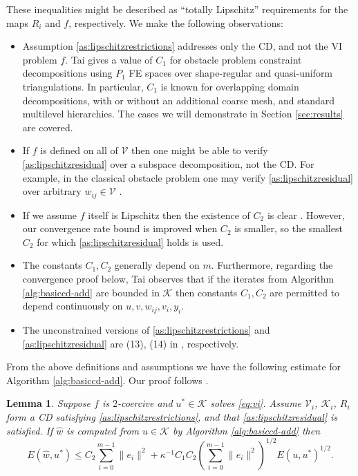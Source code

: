 \documentclass[letterpaper,final,12pt,reqno]{amsart}
\theoremstyle{cstyle}
\newtheorem{lemma}[theorem]{Lemma}
\theoremstyle{cstyle*}
\theoremstyle{dstyle}
\numberwithin{equation}{section}
\numberwithin{figure}{section}
\numberwithin{table}{section}
\numberwithin{theorem}{section}
\newcommand{\cV}{\mathcal{V}}
\begin{document}
These inequalities might be described as ``totally Lipschitz'' requirements for the maps $R_i$ and $f$, respectively.  We make the following observations:
\begin{itemize}
\item Assumption \eqref{as:lipschitzrestrictions} addresses only the CD, and not the VI problem $f$.  Tai \cite{Tai2003} gives a value of $C_1$ for obstacle problem constraint decompositions using $P_1$ FE spaces over shape-regular and quasi-uniform triangulations.  In particular, $C_1$ is known for overlapping domain decompositions, with or without an additional coarse mesh, and standard multilevel hierarchies.  The cases we will demonstrate in Section \ref{sec:results} are covered.
\item If $f$ is defined on all of $\mathcal{V}$ then one might be able to verify \eqref{as:lipschitzresidual} over a subspace decomposition, not the CD.  For example, in the classical obstacle problem one may verify \eqref{as:lipschitzresidual} over arbitrary $w_{ij} \in \cV$ \cite{Tai2003}.
\item If we assume $f$ itself is Lipschitz then the existence of $C_2$ is clear \cite{TaiXu2002}.  However, our convergence rate bound is improved when $C_2$ is smaller, so the smallest $C_2$ for which \eqref{as:lipschitzresidual} holds is used.
\item The constants $C_1,C_2$ generally depend on $m$.  Furthermore, regarding the convergence proof below, Tai \cite{Tai2003} observes that if the iterates from Algorithm \ref{alg:basiccd-add} are bounded in $\mathcal{K}$ then constants $C_1,C_2$ are permitted to depend continuously on $u,v,w_{ij},v_i,y_i$.
\item The unconstrained versions of \eqref{as:lipschitzrestrictions} and \eqref{as:lipschitzresidual} are (13), (14) in \cite{TaiXu2002}, respectively.
\end{itemize}

From the above definitions and assumptions we have the following estimate for Algorithm \ref{alg:basiccd-add}.  Our proof follows \cite{Tai2003}.

\begin{lemma} \label{lem:core}  Suppose $f$ is $2$-coercive and $u^* \in \mathcal{K}$ solves \eqref{eq:vi}.  Assume $\mathcal{V}_i$, $\mathcal{K}_i$, $R_i$ form a CD satisfying \eqref{as:lipschitzrestrictions}, and that \eqref{as:lipschitzresidual} is satisfied.  If $\hat w$ is computed from $u \in \mathcal{K}$ by Algorithm \ref{alg:basiccd-add} then
\begin{equation}
   E(\hat w,u^*) \le C_2 \sum_{i=0}^{m-1} \|e_i\|^2 + \kappa^{-1} C_1 C_2 \left(\sum_{i=0}^{m-1} \|e_i\|^2\right)^{1/2} E(u,u^*)^{1/2}. \label{eq:core}
\end{equation}
\end{lemma}
\end{document}
